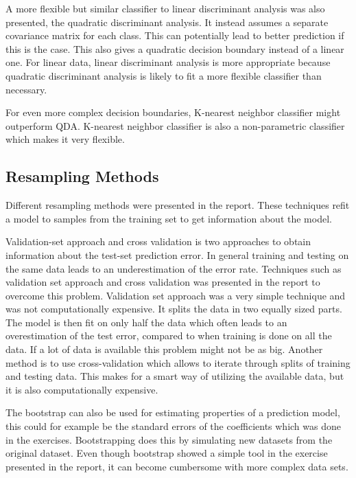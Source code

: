 A more flexible but similar classifier to linear discriminant analysis was also presented, the quadratic discriminant analysis. It instead assumes a separate covariance matrix for each class. This can potentially lead to better prediction if this is the case. This also gives a quadratic decision boundary instead of a linear one. For linear data, linear discriminant analysis is more appropriate because quadratic discriminant analysis is likely to fit a more flexible classifier than necessary.

For even more complex decision boundaries, K-nearest neighbor classifier might outperform QDA. K-nearest neighbor classifier is also a non-parametric classifier which makes it very flexible.

\subsection{Resampling Methods}
Different resampling methods were presented in the report. These techniques refit a model to samples from the training set to get information about the model. 

Validation-set approach and cross validation is two approaches to obtain information about the test-set prediction error. In general training and testing on the same data leads to an underestimation of the error rate. Techniques such as validation set approach and cross validation was presented in the report to overcome this problem. Validation set approach was a very simple technique and was not computationally expensive. It splits the data in two equally sized parts. The model is then fit on only half the data which often leads to an overestimation of the test error, compared to when training is done on all the data. If a lot of data is available this problem might not be as big. Another method is to use cross-validation which allows to iterate through splits of training and testing data. This makes for a smart way of utilizing the available data, but it is also computationally expensive.

The bootstrap can also be used for estimating properties of a prediction model, this could for example be the standard errors of the coefficients which was done in the exercises. Bootstrapping does this by simulating new datasets from the original dataset. Even though bootstrap showed a simple tool in the exercise presented in the report, it can become cumbersome with more complex data sets.

